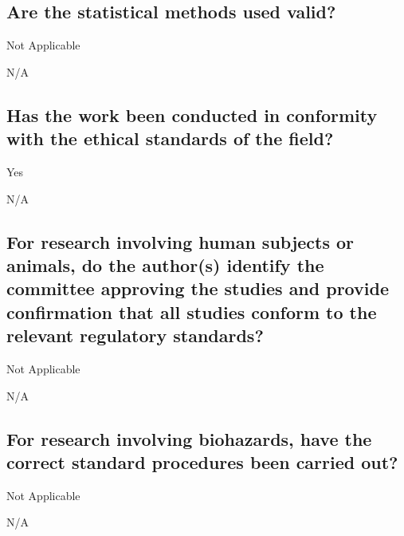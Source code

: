 \documentclass{article}
\begin{document}

\subsection{Are the statistical methods used valid?}

Not Applicable

\begin{shaded}
N/A
\end{shaded}


\subsection{Has the work been conducted in conformity with the ethical
standards of the field?}

Yes

\begin{shaded}
N/A
\end{shaded}


\subsection{For research involving human subjects or animals, do the
author(s) identify the committee approving the studies and provide confirmation
that all studies conform to the relevant regulatory standards?}

Not Applicable

\begin{shaded}
N/A
\end{shaded}


\subsection{For research involving biohazards, have the correct standard
procedures been carried out?}

Not Applicable

\begin{shaded}
N/A
\end{shaded}

\end{document}
